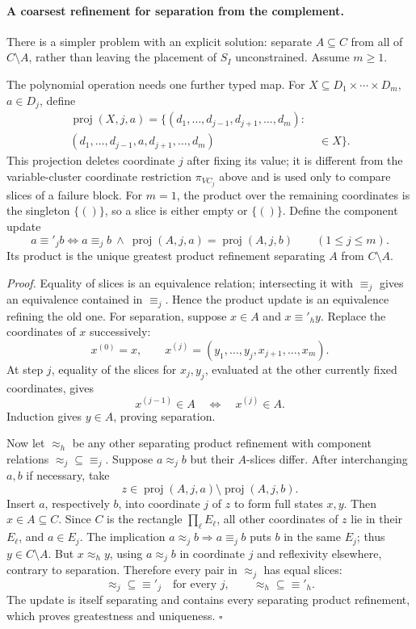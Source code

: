 \paragraph{A coarsest refinement for separation from the complement.}
There is a simpler problem with an explicit solution: separate
\(A\subseteq C\) from all of \(C\setminus A\), rather than leaving the
placement of \(S_I\) unconstrained. Assume \(m\geq1\).

The polynomial operation needs one further typed map.  For
\(X\subseteq D_1\times\cdots\times D_m\), \(a\in D_j\), define
\[
\begin{split}
 \operatorname{proj}(X,j,a)=
 \{(d_1,\ldots,d_{j-1},d_{j+1},\ldots,d_m):\;&\\
 (d_1,\ldots,d_{j-1},a,d_{j+1},\ldots,d_m)&\in X\}.
\end{split}
\]
This projection deletes coordinate \(j\) after fixing its value; it is
different from the variable-cluster coordinate restriction
\(\pi_{VC_j}\) above and is used only to compare slices of a failure block.
For \(m=1\), the product over the remaining coordinates is the singleton
\(\{()\}\), so a slice is either empty or \(\{()\}\).
Define the component update
\[
 a\equiv'_j b
 \iff
 a\equiv_j b
 \ \land\
 \operatorname{proj}(A,j,a)
   =\operatorname{proj}(A,j,b)
 \qquad(1\le j\le m).
\]
Its product is the unique greatest product refinement separating \(A\)
from \(C\setminus A\).

\emph{Proof.}
Equality of slices is an equivalence relation; intersecting it with
\(\equiv_j\) gives an equivalence contained in \(\equiv_j\). Hence the
product update is an equivalence refining the old one.
For separation, suppose \(x\in A\) and \(x\equiv'_h y\). Replace the
coordinates of \(x\) successively:
\[
 x^{(0)}=x,\qquad
 x^{(j)}=(y_1,\ldots,y_j,x_{j+1},\ldots,x_m).
\]
At step \(j\), equality of the slices for \(x_j,y_j\), evaluated at
the other currently fixed coordinates, gives
\[
 x^{(j-1)}\in A\quad\Longleftrightarrow\quad x^{(j)}\in A.
\]
Induction gives \(y\in A\), proving separation.

Now let \(\approx_h\) be any other separating product refinement with
component relations \(\approx_j\subseteq\equiv_j\). Suppose
\(a\approx_j b\) but their \(A\)-slices differ. After interchanging
\(a,b\) if necessary, take
\[
 z\in\operatorname{proj}(A,j,a)
       \setminus\operatorname{proj}(A,j,b).
\]
Insert \(a\), respectively \(b\), into coordinate \(j\) of \(z\) to form
full states \(x,y\). Then \(x\in A\subseteq C\). Since \(C\) is the
rectangle \(\prod_\ell E_\ell\), all other coordinates of \(z\) lie in
their \(E_\ell\), and \(a\in E_j\). The implication
\(a\approx_j b\Rightarrow a\equiv_j b\) puts \(b\) in the same \(E_j\);
thus \(y\in C\setminus A\). But \(x\approx_h y\), using
\(a\approx_j b\) in coordinate \(j\) and reflexivity elsewhere, contrary
to separation. Therefore every pair in \(\approx_j\) has equal slices:
\[
 \approx_j\subseteq\equiv'_j\quad\text{for every }j,
 \qquad
 \approx_h\subseteq\equiv'_h.
\]
The update is itself separating and contains every separating product
refinement, which proves greatestness and uniqueness. \(\square\)

